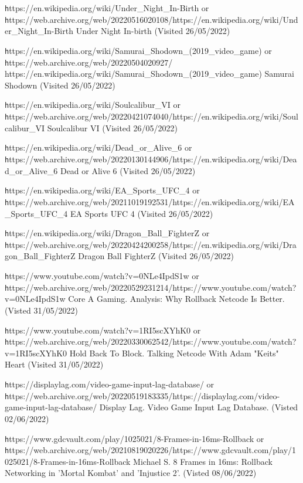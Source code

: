 \documentclass{entcs}
\begin{document}
\begin{thebibliography}{25}
 {\texttt https://en.wikipedia.org/wiki/Under\_Night\_In-Birth} or {\texttt https://web.archive.org/web/20220516020108/https://en.wikipedia.org/wiki/Under\_Night\_In-Birth} Under Night In-birth (Visited 26/05/2022)

 {\texttt https://en.wikipedia.org/wiki/Samurai\_Shodown\_(2019\_video\_game)} or {\texttt https://web.archive.org/web/20220504020927/
https://en.wikipedia.org/wiki/Samurai\_Shodown\_(2019\_video\_game)} Samurai Shodown (Visited 26/05/2022)

 {\texttt https://en.wikipedia.org/wiki/Soulcalibur\_VI} or {\texttt https://web.archive.org/web/20220421074040/https://en.wikipedia.org/wiki/Soulcalibur\_VI} Soulcalibur VI (Visited 26/05/2022)

 {\texttt https://en.wikipedia.org/wiki/Dead\_or\_Alive\_6} or {\texttt https://web.archive.org/web/20220130144906/https://en.wikipedia.org/wiki/Dead\_or\_Alive\_6} Dead or Alive 6 (Visited 26/05/2022)

 {\texttt https://en.wikipedia.org/wiki/EA\_Sports\_UFC\_4} or {\texttt https://web.archive.org/web/20211019192531/https://en.wikipedia.org/wiki/EA\_Sports\_UFC\_4} EA Sports UFC 4 (Visited 26/05/2022)

 {\texttt https://en.wikipedia.org/wiki/Dragon\_Ball\_FighterZ} or {\texttt https://web.archive.org/web/20220424200258/https://en.wikipedia.org/wiki/Dragon\_Ball\_FighterZ} Dragon Ball FighterZ (Visited 26/05/2022)

 {\texttt https://www.youtube.com/watch?v=0NLe4IpdS1w} or {\texttt https://web.archive.org/web/20220529231214/https://www.youtube.com/watch?v=0NLe4IpdS1w} Core A Gaming. Analysis: Why Rollback Netcode Is Better. (Visted 31/05/2022)

 {\texttt https://www.youtube.com/watch?v=1RI5scXYhK0} or {\texttt https://web.archive.org/web/20220330062542/https://www.youtube.com/watch?v=1RI5scXYhK0} Hold Back To Block. Talking Netcode With Adam "Keits" Heart (Visited 31/05/2022)

 {\texttt https://displaylag.com/video-game-input-lag-database/} or {\texttt https://web.archive.org/web/20220519183335/https://displaylag.com/video-game-input-lag-database/} Display Lag. Video Game Input Lag Database. (Visted 02/06/2022)

 {\texttt https://www.gdcvault.com/play/1025021/8-Frames-in-16ms-Rollback} or {\texttt https://web.archive.org/web/20210819020226/https://www.gdcvault.com/play/1025021/8-Frames-in-16ms-Rollback} Michael S. 8 Frames in 16ms: Rollback Networking in 'Mortal Kombat' and 'Injustice 2'. (Visted 08/06/2022)


\end{thebibliography}
\end{document}
